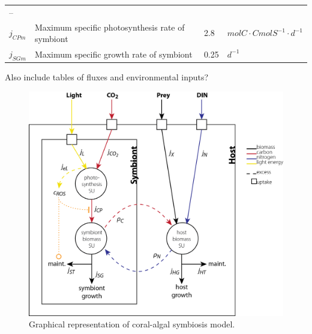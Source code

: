 \documentclass[]{elsarticle} %
\makeatletter
\def\maxwidth{\ifdim\Gin@nat@width>\linewidth\linewidth
\else\Gin@nat@width\fi}
\let\Oldincludegraphics\includegraphics
\renewcommand{\includegraphics}[1]{\Oldincludegraphics[width=\maxwidth]{#1}}
\makeatother
\begin{document}
\begin{longtable}[c]{@{}llll@{}}
\begin{minipage}[t]{0.23\columnwidth}
--
\strut\end{minipage}\tabularnewline
\begin{minipage}[t]{0.10\columnwidth}\raggedright\strut
\(j_{CPm}\)
\strut\end{minipage} &
\begin{minipage}[t]{0.48\columnwidth}\raggedright\strut
Maximum specific photosynthesis rate of symbiont
\strut\end{minipage} &
\begin{minipage}[t]{0.09\columnwidth}\raggedright\strut
2.8
\strut\end{minipage} &
\begin{minipage}[t]{0.23\columnwidth}\raggedright\strut
\(molC \cdot CmolS^{-1} \cdot d^{-1}\)
\strut\end{minipage}\tabularnewline
\begin{minipage}[t]{0.10\columnwidth}\raggedright\strut
\(j_{SGm}\)
\strut\end{minipage} &
\begin{minipage}[t]{0.48\columnwidth}\raggedright\strut
Maximum specific growth rate of symbiont
\strut\end{minipage} &
\begin{minipage}[t]{0.09\columnwidth}\raggedright\strut
0.25
\strut\end{minipage} &
\begin{minipage}[t]{0.23\columnwidth}\raggedright\strut
\(d^{-1}\)
\strut\end{minipage}\tabularnewline
\bottomrule
\end{longtable}

Also include tables of fluxes and environmental inputs?

\begin{figure}[htbp]
\centering
\includegraphics{../img/model.png}
\caption{Graphical representation of coral-algal symbiosis model.}
\end{figure}
\end{document}
